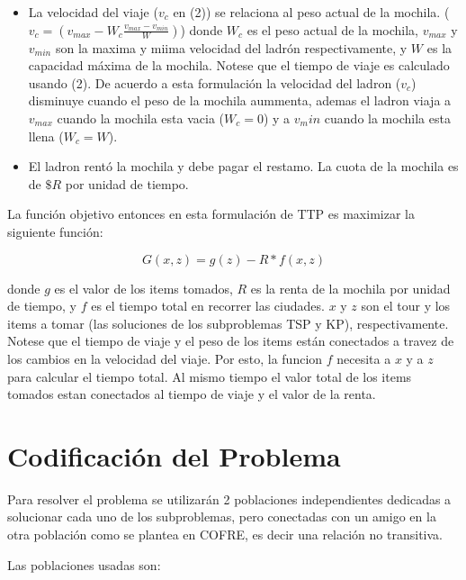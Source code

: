 \documentclass[twocolumn]{IEEEtran}
\begin{document}
\begin{itemize}
    \item La velocidad del viaje ($v_c$ en (2)) se relaciona al peso actual de la mochila.
    ($v_c = (v_{max} - W_c \frac{v_{max}-v_{min}}{W})$)
    donde $W_c$ es el peso actual de la mochila, $v_{max}$ y $v_{min}$
    son la maxima y miima velocidad del ladrón respectivamente, y
    $W$ es la capacidad máxima de la mochila. Notese que 
    el tiempo de viaje es calculado usando (2).
    De acuerdo a esta formulación la velocidad del ladron ($v_c$)
    disminuye cuando el peso de la mochila aummenta, ademas el ladron
    viaja a $v_{max}$ cuando la mochila esta vacia
    ($W_c=0$) y a $v_min$ cuando la mochila esta llena ($W_c=W$).

    \item El ladron rentó la mochila y debe pagar el restamo.
    La cuota de la mochila es de $\$R$ por unidad de tiempo.

\end{itemize}

    La función objetivo entonces en esta formulación de TTP es maximizar la siguiente función:

    \begin{equation}
        G(x,z) = g(z) - R*f(x,z)
    \end{equation}

    donde $g$ es el valor de los items tomados, $R$ es la renta de la mochila
    por unidad de tiempo, y $f$ es el tiempo total en recorrer las ciudades. $x$ y $z$ son el
    tour y los items a tomar (las soluciones de los subproblemas TSP y KP), respectivamente.
    Notese que el tiempo de viaje y el peso de los items están conectados a travez de los
    cambios en la velocidad del viaje. Por esto, la funcion $f$ necesita a $x$ y a $z$
    para calcular el tiempo total. Al mismo tiempo el valor total de los items tomados
    estan conectados al tiempo de viaje y el valor de la renta.

\section{Codificación del Problema}

Para resolver el problema se utilizarán 2 poblaciones independientes dedicadas a 
solucionar cada uno de los subproblemas, pero conectadas con un amigo en la otra población
como se plantea en COFRE, es decir una relación no transitiva.%

Las poblaciones usadas son:
\end{document}
